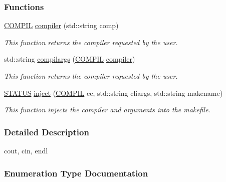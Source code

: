\subsubsection*{Functions}
\begin{DoxyCompactItemize}
\item 
\mbox{\hyperlink{namespacecompilation_ab8b552e73f4f5a4912982468f052f089}{C\+O\+M\+P\+IL}} \mbox{\hyperlink{namespacecompilation_ade0240a5a26a4d43e6bc19ff6c1b1085}{compiler}} (std\+::string comp)
\begin{DoxyCompactList}\small\item\em This function returns the compiler requested by the user. \end{DoxyCompactList}\item 
std\+::string \mbox{\hyperlink{namespacecompilation_a02be2d606b5d56c721ad17b111d53298}{compilargs}} (\mbox{\hyperlink{namespacecompilation_ab8b552e73f4f5a4912982468f052f089}{C\+O\+M\+P\+IL}} \mbox{\hyperlink{namespacecompilation_ade0240a5a26a4d43e6bc19ff6c1b1085}{compiler}})
\begin{DoxyCompactList}\small\item\em This function returns the compiler requested by the user. \end{DoxyCompactList}\item 
\mbox{\hyperlink{functions_8h_a32c27cc471df37f4fc818d65de0a56c4}{S\+T\+A\+T\+US}} \mbox{\hyperlink{namespacecompilation_a8903c2b63e13907904d398bca6d64d9f}{inject}} (\mbox{\hyperlink{namespacecompilation_ab8b552e73f4f5a4912982468f052f089}{C\+O\+M\+P\+IL}} cc, std\+::string cliargs, std\+::string makename)
\begin{DoxyCompactList}\small\item\em This function injects the compiler and arguments into the makefile. \end{DoxyCompactList}\end{DoxyCompactItemize}


\subsubsection{Detailed Description}
cout, cin, endl 

\subsubsection{Enumeration Type Documentation}
\mbox{\label{namespacecompilation_ab8b552e73f4f5a4912982468f052f089}} 

